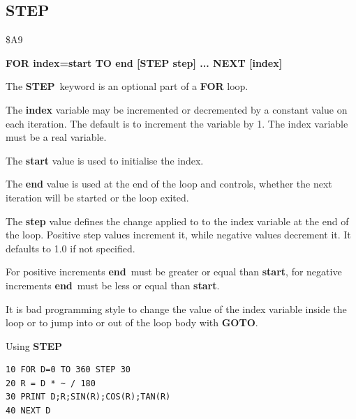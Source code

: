 
\newpage
\subsection{STEP}
\begin{description}[leftmargin=2cm,style=nextline]
\item [Token:] \$A9
\item [Format:] {\bf FOR index=start TO end [STEP step] ... NEXT [index]}
\item [Usage:] The {\bf STEP} keyword is an optional part of a
               {\bf FOR} loop.

               The {\bf index} variable may be incremented or decremented
               by a constant value on each iteration. The default
               is to increment the variable by 1.
               The index variable must be a real variable.

               The {\bf start} value is used to initialise the index.

               The {\bf end} value is used at the end of the loop
               and controls, whether the next iteration will be started
               or the loop exited.

               The {\bf step} value defines the change applied to
               to the index variable at the end of the loop.
               Positive step values increment it, while negative values
               decrement it. It defaults to 1.0 if not specified.

\item [Remarks:] For positive increments {\bf end} must be greater
               or equal than {\bf start}, for negative increments
               {\bf end} must be less or equal than {\bf start}.

               It is bad programming style to change the value
               of the index variable inside the loop or to
               jump into or out of the loop body with {\bf GOTO}.

\item [Example:] Using {\bf STEP}
\begin{tcolorbox}[colback=black,coltext=white]
\verbatimfont{\codefont}
\begin{verbatim}
10 FOR D=0 TO 360 STEP 30
20 R = D * ~ / 180
30 PRINT D;R;SIN(R);COS(R);TAN(R)
40 NEXT D
\end{verbatim}
\end{tcolorbox}
\end{description}

